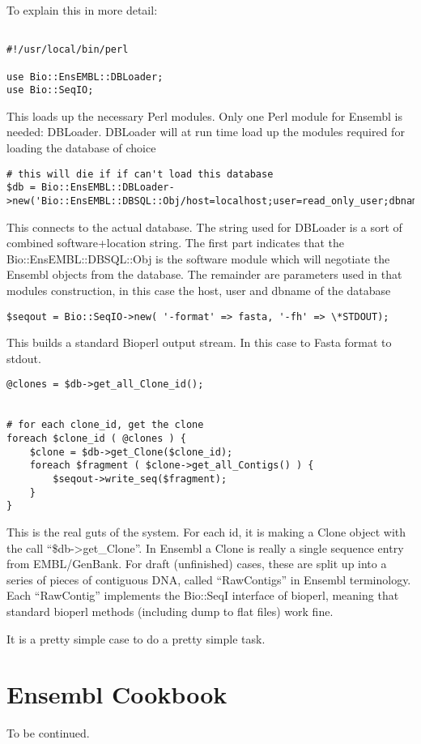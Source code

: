 \documentclass[11pt,a4paper]{article}
\begin{document}
To explain this in more detail:

\begin{verbatim}

#!/usr/local/bin/perl

use Bio::EnsEMBL::DBLoader;
use Bio::SeqIO;

\end{verbatim}

This loads up the necessary Perl modules. Only one Perl module for Ensembl is needed: DBLoader.
DBLoader will at run time load up the modules required for loading the database of choice

\begin{verbatim}
# this will die if if can't load this database
$db = Bio::EnsEMBL::DBLoader->new('Bio::EnsEMBL::DBSQL::Obj/host=localhost;user=read_only_user;dbname=test_ensembl');
\end{verbatim}

This connects to the actual database. The string used for DBLoader is a sort of combined software+location
string. The first part indicates that the Bio::EnsEMBL::DBSQL::Obj is the software module which will
negotiate the Ensembl objects from the database. The remainder are parameters used in that modules
construction, in this case the host, user and dbname of the database

\begin{verbatim}
$seqout = Bio::SeqIO->new( '-format' => fasta, '-fh' => \*STDOUT);
\end{verbatim}

This builds a standard Bioperl output stream. In this case to Fasta format to stdout.

\begin{verbatim}
@clones = $db->get_all_Clone_id();


# for each clone_id, get the clone
foreach $clone_id ( @clones ) {
	$clone = $db->get_Clone($clone_id);
	foreach $fragment ( $clone->get_all_Contigs() ) {
		$seqout->write_seq($fragment);
   	}
}
\end{verbatim}

This is the real guts of the system. For each id, it is making a Clone object with the call
``\$db->get\_Clone''. In Ensembl a Clone is really a single sequence entry from EMBL/GenBank. For
draft (unfinished) cases, these are split up into a series of pieces of contiguous DNA, called ``RawContigs''
in Ensembl terminology. Each ``RawContig'' implements the Bio::SeqI interface of bioperl, meaning that standard
bioperl methods (including dump to flat files) work fine. 


It is a pretty simple case to do a pretty simple task. 

\section{Ensembl Cookbook}

To be continued.
\end{document}
